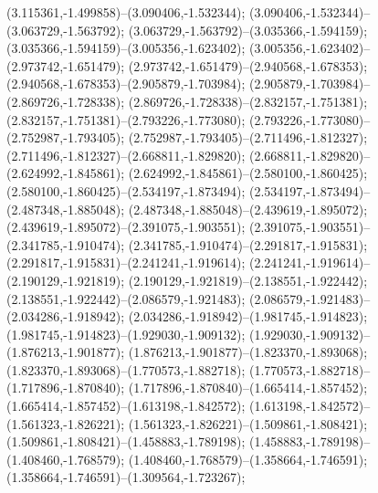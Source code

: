  (3.115361,-1.499858)--(3.090406,-1.532344);
 (3.090406,-1.532344)--(3.063729,-1.563792);
 (3.063729,-1.563792)--(3.035366,-1.594159);
 (3.035366,-1.594159)--(3.005356,-1.623402);
 (3.005356,-1.623402)--(2.973742,-1.651479);
 (2.973742,-1.651479)--(2.940568,-1.678353);
 (2.940568,-1.678353)--(2.905879,-1.703984);
 (2.905879,-1.703984)--(2.869726,-1.728338);
 (2.869726,-1.728338)--(2.832157,-1.751381);
 (2.832157,-1.751381)--(2.793226,-1.773080);
 (2.793226,-1.773080)--(2.752987,-1.793405);
 (2.752987,-1.793405)--(2.711496,-1.812327);
 (2.711496,-1.812327)--(2.668811,-1.829820);
 (2.668811,-1.829820)--(2.624992,-1.845861);
 (2.624992,-1.845861)--(2.580100,-1.860425);
 (2.580100,-1.860425)--(2.534197,-1.873494);
 (2.534197,-1.873494)--(2.487348,-1.885048);
 (2.487348,-1.885048)--(2.439619,-1.895072);
 (2.439619,-1.895072)--(2.391075,-1.903551);
 (2.391075,-1.903551)--(2.341785,-1.910474);
 (2.341785,-1.910474)--(2.291817,-1.915831);
 (2.291817,-1.915831)--(2.241241,-1.919614);
 (2.241241,-1.919614)--(2.190129,-1.921819);
 (2.190129,-1.921819)--(2.138551,-1.922442);
 (2.138551,-1.922442)--(2.086579,-1.921483);
 (2.086579,-1.921483)--(2.034286,-1.918942);
 (2.034286,-1.918942)--(1.981745,-1.914823);
 (1.981745,-1.914823)--(1.929030,-1.909132);
 (1.929030,-1.909132)--(1.876213,-1.901877);
 (1.876213,-1.901877)--(1.823370,-1.893068);
 (1.823370,-1.893068)--(1.770573,-1.882718);
 (1.770573,-1.882718)--(1.717896,-1.870840);
 (1.717896,-1.870840)--(1.665414,-1.857452);
 (1.665414,-1.857452)--(1.613198,-1.842572);
 (1.613198,-1.842572)--(1.561323,-1.826221);
 (1.561323,-1.826221)--(1.509861,-1.808421);
 (1.509861,-1.808421)--(1.458883,-1.789198);
 (1.458883,-1.789198)--(1.408460,-1.768579);
 (1.408460,-1.768579)--(1.358664,-1.746591);
 (1.358664,-1.746591)--(1.309564,-1.723267);
